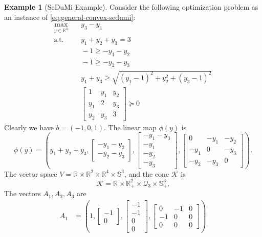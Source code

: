 \documentclass[
]{book}
\theoremstyle{definition}
\theoremstyle{definition}
\newtheorem{example}{Example}[chapter]
\theoremstyle{definition}
\theoremstyle{definition}
\theoremstyle{remark}
\begin{document}
\begin{example}[SeDuMi Example]
\protect\hypertarget{exm:SeDuMiExample}{}\label{exm:SeDuMiExample}Consider the following optimization problem as an instance of \eqref{eq:general-convex-sedumi}:
\begin{equation}
\begin{split}
\max_{y \in \mathbb{R}^{3}} & \quad y_3 - y_1 \\
\mathrm{s.t.}& \quad y_1 + y_2 + y_3 = 3\\
& \quad -1 \geq -y_1 - y_2 \\
& \quad -1 \geq -y_2 - y_3 \\
& \quad y_1 + y_3 \geq \sqrt{(y_1-1)^2 + y_2^2 + (y_3 -1)^2} \\
& \quad \begin{bmatrix} 1 & y_1 & y_2 \\ y_1 & 2 & y_3 \\ y_2 & y_3 & 3 \end{bmatrix} \succeq 0
\end{split}
\label{eq:sedumi-example}
\end{equation}
Clearly we have \(b = (-1,0,1)\). The linear map \(\phi(y)\) is
\[
\phi(y) = \left( y_1+y_2+y_3,\begin{bmatrix} -y_1 - y_2 \\ - y_2 - y_3 \end{bmatrix}, \begin{bmatrix} - y_1 - y_3 \\ -y_1 \\ -y_2 \\ -y_3 \end{bmatrix}, \begin{bmatrix} 0 & -y_1 & -y_2 \\ -y_1 & 0 & -y_3 \\ -y_2 & -y_3 & 0 \end{bmatrix} \right).
\]
The vector space \(V=\mathbb{R}^{} \times \mathbb{R}^{2} \times \mathbb{R}^{4} \times \mathbb{S}^{3}\), and the cone \(\mathcal{K}\) is
\[
\mathcal{K}= \mathbb{R}^{} \times \mathbb{R}^{2}_{+} \times \mathcal{Q}_3 \times \mathbb{S}^{3}_{+}.
\]
The vectors \(A_1,A_2,A_3\) are
\begin{equation}
\begin{split}
A_1 &= \left( 1,\begin{bmatrix}-1\\0\end{bmatrix}, \begin{bmatrix}-1\\-1\\0\\0\end{bmatrix},\begin{bmatrix}0&-1&0\\-1&0&0\\0&0&0\end{bmatrix} \right)\\

\end{split}
\end{equation}
\end{example}
\end{document}
